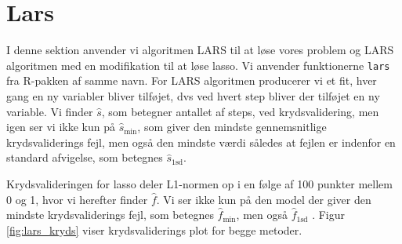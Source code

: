 \section{Lars}
I denne sektion anvender vi algoritmen LARS til at løse vores problem og LARS algoritmen med en modifikation til at løse lasso. 
Vi anvender funktionerne \texttt{lars} fra R-pakken af samme navn. 
For LARS algoritmen producerer vi et fit, hver gang en ny variabler bliver tilføjet, dvs ved hvert step bliver der tilføjet en ny variable. Vi finder $\widehat{s}$, som betegner antallet af steps, ved krydsvalidering, men igen ser vi ikke kun på  $\widehat{s}_{\min}$, som giver den mindste gennemsnitlige krydsvaliderings fejl, men også den mindste værdi således at fejlen er indenfor en standard afvigelse, som betegnes $\widehat{s}_{\text{1sd}}$. 

Krydsvalideringen for lasso deler L1-normen op i en følge af 100 punkter mellem 0 og 1, hvor vi herefter finder $\widehat{f}$. Vi ser ikke kun på den model der giver den mindste krydsvaliderings fejl, som betegnes  $\widehat{f}_{\min}$, men også  $\widehat{f}_{\text{1sd}}$ . 
Figur \ref{fig:lars_kryds} viser krydsvaliderings plot for begge metoder. 



%
%
%
%
%

